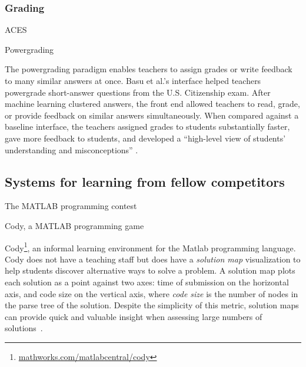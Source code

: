 \subsubsection{Grading}
ACES

Powergrading

The powergrading paradigm \cite{basupowergrading} enables teachers to assign grades or write feedback to many similar answers at once. Basu et al.'s \cite{basupowergrading} interface helped teachers powergrade short-answer questions from the U.S. Citizenship exam. After machine learning clustered answers, the front end allowed teachers to read, grade, or provide feedback on similar answers simultaneously. When compared against a baseline interface, the teachers assigned grades to students substantially faster, gave more feedback to students, and developed a ``high-level view of students' understanding and misconceptions'' \cite{basuDivideAndConquer}.



\begin{comment}
Singh et al.'s automated feedback represents one end of the spectrum for providing tailored feedback to students because hints are algorithmically generated \cite{autograder}. Basu et al. \cite{basupowergrading} represent the other end, by ``force multiplying'' human-generated feedback or ``powergrading.''



However, the suggestions lack explanations in plain language unless they are added by experts (teachers), so the limits imposed by the time, expense, and curse of knowledge of experts still apply.
\end{comment}

\subsection{Systems for learning from fellow competitors}

The MATLAB programming contest

Cody, a MATLAB programming game

Cody\footnote{\url{mathworks.com/matlabcentral/cody}}, an informal learning environment for the Matlab programming language. Cody does not have a teaching staff but does have a {\em solution map} visualization to help students discover alternative ways to solve a problem. A solution map plots each solution as a point against two axes: time of submission on the horizontal axis, and code size on the vertical axis, where \textit{code size} is the number of nodes in the parse tree of the solution. Despite the simplicity of this metric, solution maps can provide quick and valuable insight when assessing large numbers of solutions~\cite{ICERGlassman}.


